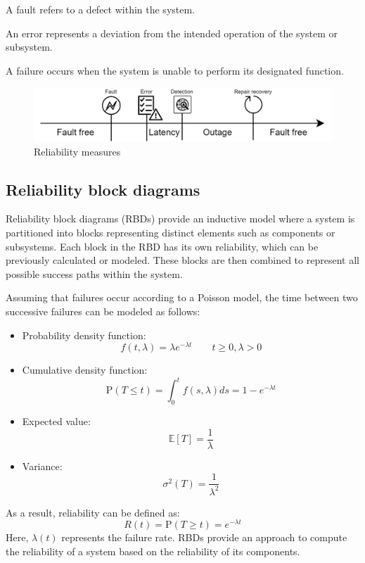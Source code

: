 \begin{definition}
    A fault refers to a defect within the system.
\end{definition}
\begin{definition}
    An error represents a deviation from the intended operation of the system or subsystem.
\end{definition}
\begin{definition}
    A failure occurs when the system is unable to perform its designated function.
\end{definition}
\begin{figure}[H]
    \centering
    \includegraphics[width=0.75\linewidth]{images/rel.png}
    \caption{Reliability measures}
\end{figure}

\subsection{Reliability block diagrams}
Reliability block diagrams (RBDs) provide an inductive model where a system is partitioned into blocks representing distinct elements such as components or subsystems. 
Each block in the RBD has its own reliability, which can be previously calculated or modeled. 
These blocks are then combined to represent all possible success paths within the system.

Assuming that failures occur according to a Poisson model, the time between two successive failures can be modeled as follows:
\begin{itemize}
    \item Probability density function: 
        \[f(t,\lambda)=\lambda e^{-\lambda t} \qquad t\geq 0, \lambda > 0\]
    \item Cumulative density function:
        \[\text{P}(T\leq t)=\int_0^t f(s,\lambda)ds=1-e^{-\lambda t}\]
    \item Expected value: 
        \[\mathbb{E}\left[T\right]=\dfrac{1}{\lambda}\]
    \item Variance: 
        \[\sigma^2(T)=\dfrac{1}{\lambda^2}\]
\end{itemize}
As a result, reliability can be defined as:
\[R(t)=\text{P}(T \geq t)=e^{-\lambda t}\]
Here, $\lambda(t)$ represents the failure rate. 
RBDs provide an approach to compute the reliability of a system based on the reliability of its components.
